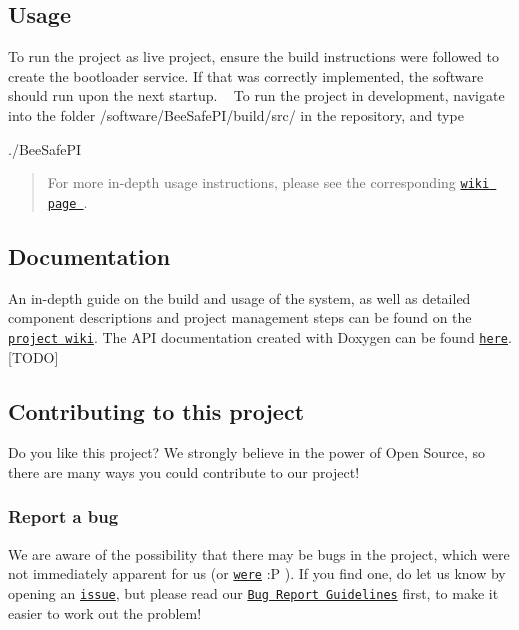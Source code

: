 \subsection*{Usage}

To run the project as live project, ensure the build instructions were followed to create the bootloader service. If that was correctly implemented, the software should run upon the next startup. ~\newline
 To run the project in development, navigate into the folder {\ttfamily /software/\+Bee\+Safe\+P\+I/build/src/} in the repository, and type 
\begin{DoxyCode}
./BeeSafePI
\end{DoxyCode}
 \begin{quote}
For more in-\/depth usage instructions, please see the corresponding \href{https://github.com/itsBelinda/ENG5220-2020-Team13/wiki/User-Guide}{\tt wiki page }. \end{quote}


\subsection*{Documentation}

An in-\/depth guide on the build and usage of the system, as well as detailed component descriptions and project management steps can be found on the \href{https://github.com/itsBelinda/ENG5220-2020-Team13/wiki}{\tt project wiki}. The A\+PI documentation created with Doxygen can be found \href{}{\tt here}. \mbox{[}T\+O\+DO\mbox{]}

\subsection*{Contributing to this project}

Do you like this project? We strongly believe in the power of Open Source, so there are many ways you could contribute to our project!

\subsubsection*{Report a bug}

We are aware of the possibility that there may be bugs in the project, which were not immediately apparent for us (or \href{https://github.com/itsBelinda/ENG5220-2020-Team13/wiki/Project-Management%3A-Further-Work}{\tt were} \+:P ). If you find one, do let us know by opening an \href{https://github.com/itsBelinda/ENG5220-2020-Team13/issues}{\tt issue}, but please read our \href{https://github.com/itsBelinda/ENG5220-2020-Team13/blob/master/.github/ISSUE_TEMPLATE/bug_report.md}{\tt Bug Report Guidelines} first, to make it easier to work out the problem!

